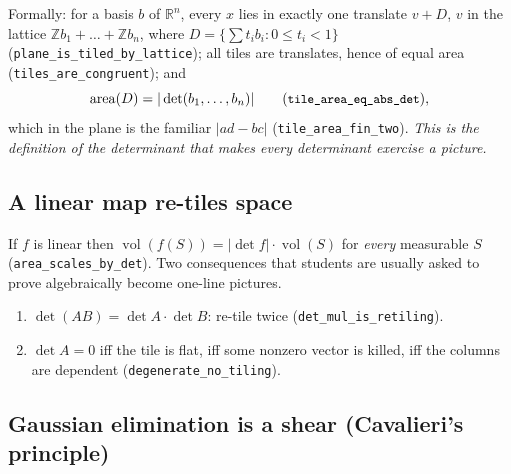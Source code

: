 \documentclass[11pt]{article}
\theoremstyle{definition}
\theoremstyle{plain}
\theoremstyle{remark}
\newcommand{\lean}[1]{\texttt{\small #1}}
\newcommand{\Z}{\mathbb{Z}}
\newcommand{\R}{\mathbb{R}}
\begin{document}
Formally: for a basis $b$ of $\R^n$, every $x$ lies in exactly one translate
$v + D$, $v$ in the lattice $\Z b_1 + \dots + \Z b_n$, where
$D = \{\sum t_ib_i : 0 \le t_i < 1\}$ (\lean{plane\_is\_tiled\_by\_lattice}); all
tiles are translates, hence of equal area (\lean{tiles\_are\_congruent}); and
\[
  \operatorname{area}(D) = |\det(b_1,\dots,b_n)|
  \qquad\text{(\lean{tile\_area\_eq\_abs\_det})} ,
\]
which in the plane is the familiar $|ad-bc|$ (\lean{tile\_area\_fin\_two}).
\emph{This is the definition of the determinant that makes every determinant
exercise a picture.}

\subsection{A linear map re-tiles space}

If $f$ is linear then $\operatorname{vol}(f(S)) = |\det f| \cdot
\operatorname{vol}(S)$ for \emph{every} measurable $S$
(\lean{area\_scales\_by\_det}).  Two consequences that students are usually
asked to prove algebraically become one-line pictures.

\begin{center}
\end{center}

\begin{enumerate}
\item $\det(AB) = \det A \cdot \det B$: re-tile twice
  (\lean{det\_mul\_is\_retiling}).
\item $\det A = 0$ iff the tile is flat, iff some nonzero vector is killed, iff
  the columns are dependent (\lean{degenerate\_no\_tiling}).
\end{enumerate}

\subsection{Gaussian elimination is a shear (Cavalieri's principle)}
\end{document}

